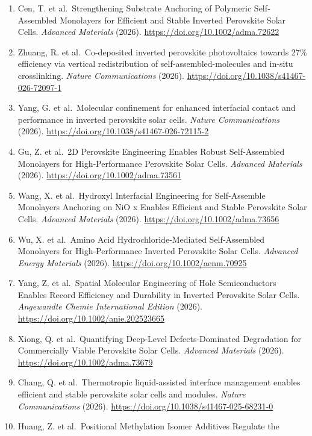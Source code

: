 \documentclass[
  11pt,
]{article}
\begin{document}
\begin{enumerate}
  (2026). \url{https://doi.org/10.1016/j.scib.2026.02.050}
\item
  Cen, T. et al.~Strengthening Substrate Anchoring of Polymeric
  Self‐Assembled Monolayers for Efficient and Stable Inverted Perovskite
  Solar Cells. \emph{Advanced Materials} (2026).
  \url{https://doi.org/10.1002/adma.72622}
\item
  Zhuang, R. et al.~Co-deposited inverted perovskite photovoltaics
  towards 27\% efficiency via vertical redistribution of
  self-assembled-molecules and in-situ crosslinking. \emph{Nature
  Communications} (2026).
  \url{https://doi.org/10.1038/s41467-026-72097-1}
\item
  Yang, G. et al.~Molecular confinement for enhanced interfacial contact
  and performance in inverted perovskite solar cells. \emph{Nature
  Communications} (2026).
  \url{https://doi.org/10.1038/s41467-026-72115-2}
\item
  Gu, Z. et al.~2D Perovskite Engineering Enables Robust Self‐Assembled
  Monolayers for High‐Performance Perovskite Solar Cells. \emph{Advanced
  Materials} (2026). \url{https://doi.org/10.1002/adma.73561}
\item
  Wang, X. et al.~Hydroxyl Interfacial Engineering for Self‐Assemble
  Monolayers Anchoring on NiO x Enables Efficient and Stable Perovskite
  Solar Cells. \emph{Advanced Materials} (2026).
  \url{https://doi.org/10.1002/adma.73656}
\item
  Wu, X. et al.~Amino Acid Hydrochloride‐Mediated Self‐Assembled
  Monolayers for High‐Performance Inverted Perovskite Solar Cells.
  \emph{Advanced Energy Materials} (2026).
  \url{https://doi.org/10.1002/aenm.70925}
\item
  Yang, Z. et al.~Spatial Molecular Engineering of Hole Semiconductors
  Enables Record Efficiency and Durability in Inverted Perovskite Solar
  Cells. \emph{Angewandte Chemie International Edition} (2026).
  \url{https://doi.org/10.1002/anie.202523665}
\item
  Xiong, Q. et al.~Quantifying Deep‐Level Defects‐Dominated Degradation
  for Commercially Viable Perovskite Solar Cells. \emph{Advanced
  Materials} (2026). \url{https://doi.org/10.1002/adma.73679}
\item
  Chang, Q. et al.~Thermotropic liquid-assisted interface management
  enables efficient and stable perovskite solar cells and modules.
  \emph{Nature Communications} (2026).
  \url{https://doi.org/10.1038/s41467-025-68231-0}
\item
  Huang, Z. et al.~Positional Methylation Isomer Additives Regulate the

\end{enumerate}
\end{document}

